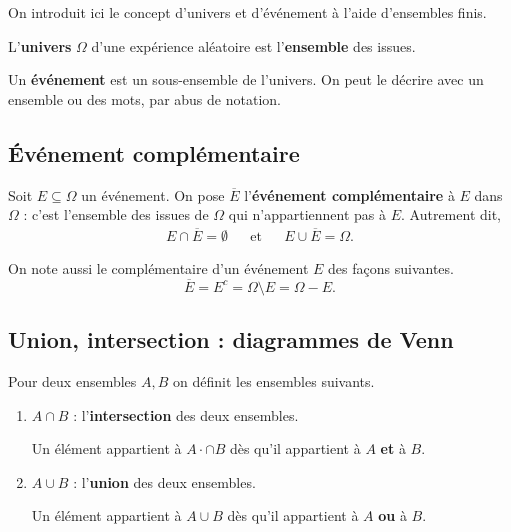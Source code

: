 \documentclass[a4paper, 12pt]{report}
\begin{document}
On introduit ici le concept d'univers et d'événement à l'aide d'ensembles finis.

\begin{defn}[univers]
	L'\textbf{univers} $\Omega$ d'une expérience aléatoire est l'\textbf{ensemble} des issues.
\end{defn}

\begin{defn}[évènement]
	Un \textbf{événement} est un sous-ensemble de l'univers.
	On peut le décrire avec un ensemble ou des mots, par abus de notation.
\end{defn}

\subsection{Événement complémentaire}

\begin{defn}
	Soit $E \subseteq \Omega$ un événement.
	On pose $\overline{E}$ l'\textbf{événement complémentaire} à $E$ dans $\Omega$ : c'est l'ensemble des issues de $\Omega$ qui n'appartiennent pas à $E$.
	Autrement dit,
		\begin{align*}
			E \cap \overline{E} = \emptyset && \text{et} && E \cup \overline{E} = \Omega.
		\end{align*}
\end{defn}

\begin{nota}
	On note aussi le complémentaire d'un événement $E$ des façons suivantes.
		\[ \overline{E} = E^c = \Omega \setminus E = \Omega - E. \]
\end{nota}

\subsection{Union, intersection : diagrammes de Venn}

\begin{defn}
	Pour deux ensembles $A, B$ on définit les ensembles suivants.
		\begin{enumerate}
			\item $A \cap B$ : l'\textbf{intersection} des deux ensembles.
			
			Un élément appartient à $A· \cap B$ dès qu'il appartient à $A$ \textbf{et} à $B$.
			\item $A \cup B$ : l'\textbf{union} des deux ensembles.
			
			Un élément appartient à $A \cup B$ dès qu'il appartient à $A$ \textbf{ou} à $B$.
		\end{enumerate}
\end{defn}
\end{document}
